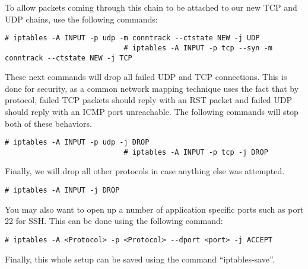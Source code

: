 						To allow packets coming through this chain to be attached to our new TCP and UDP chains, use the following commands:
						\begin{lstlisting}[style=CLI]
							# iptables -A INPUT -p udp -m conntrack --ctstate NEW -j UDP
							# iptables -A INPUT -p tcp --syn -m conntrack --ctstate NEW -j TCP
						\end{lstlisting}
						These next commands will drop all failed UDP and TCP connections.
						This is done for security, as a common network mapping technique uses the fact that by protocol, failed TCP packets should reply with an RST packet and failed UDP should reply with an ICMP port unreachable.
						The following commands will stop both of these behaviors.
						\begin{lstlisting}[style=CLI]
							# iptables -A INPUT -p udp -j DROP
							# iptables -A INPUT -p tcp -j DROP
						\end{lstlisting}
						Finally, we will drop all other protocols in case anything else was attempted.
						\begin{lstlisting}[style=CLI]
							# iptables -A INPUT -j DROP
						\end{lstlisting}
						You may also want to open up a number of application specific ports such as port 22 for SSH.
						This can be done using the following command:
						\begin{lstlisting}[style=CLI]
							# iptables -A <Protocol> -p <Protocol> --dport <port> -j ACCEPT
						\end{lstlisting}
						Finally, this whole setup can be saved using the command ``iptables-save''.


